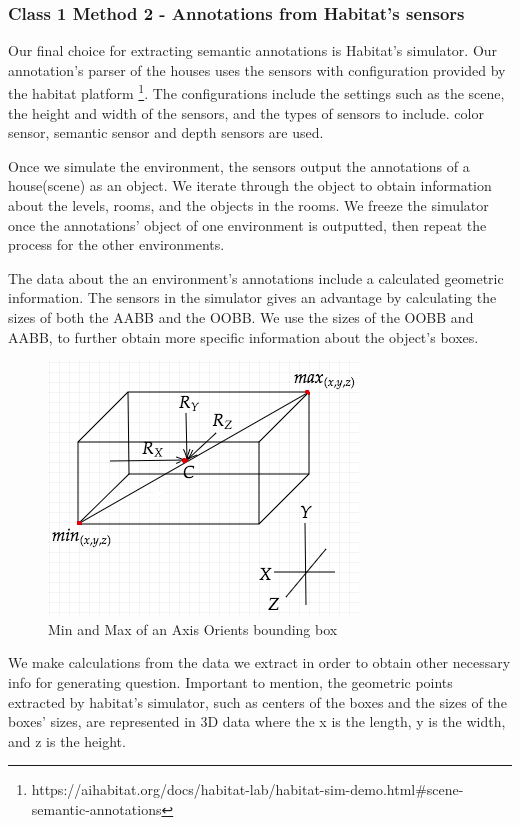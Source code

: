 \subsubsection{Class 1 Method 2 - Annotations from Habitat's sensors}

Our final choice for extracting semantic annotations is Habitat's simulator. Our annotation's parser of the houses uses the sensors with configuration provided by the habitat platform \footnote{https://aihabitat.org/docs/habitat-lab/habitat-sim-demo.html#scene-semantic-annotations}. The configurations include the settings such as the scene, the height and width of the sensors, and the types of sensors to include. color sensor, semantic sensor and depth sensors are used. 

Once we simulate the environment, the sensors output the annotations of a house(scene) as an object. We iterate through the object to obtain information about the levels, rooms, and the objects in the rooms. We freeze the simulator once the annotations' object of one environment is outputted, then repeat the process for the other environments. 

The data about the an environment's annotations include a calculated geometric information. The sensors in the simulator gives an advantage by calculating the sizes of both the AABB and the OOBB. We use the sizes of the OOBB and AABB, to further obtain more specific information about the object's boxes. 


\begin{figure}[H]
\includegraphics[scale=0.5]{images/Geoinfo.png}
\caption{Min and Max of an Axis Orients bounding box}
\label{fig:aabb}
\end{figure}


We make calculations from the data we extract in order to obtain other necessary info for generating question. Important to mention, the geometric points extracted by habitat's simulator, such as centers of the boxes and the sizes of the boxes' sizes, are represented in 3D data where the  x is the length, y is the width, and z is the height. 

